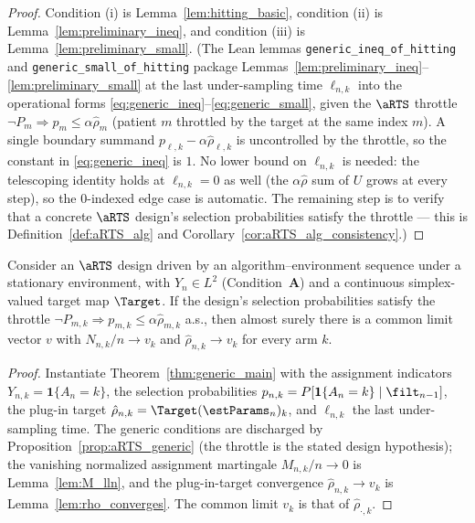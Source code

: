 \begin{proof}
Condition (i) is Lemma~\ref{lem:hitting_basic}, condition (ii) is
Lemma~\ref{lem:preliminary_ineq}, and condition (iii) is
Lemma~\ref{lem:preliminary_small}. (The Lean lemmas
\texttt{generic\_ineq\_of\_hitting} and \texttt{generic\_small\_of\_hitting} package
Lemmas~\ref{lem:preliminary_ineq}--\ref{lem:preliminary_small} at the last under-sampling time
$\ell_{n,k}$ into the operational forms \eqref{eq:generic_ineq}--\eqref{eq:generic_small},
given the $\aRTS$ throttle $\neg P_m \Rightarrow p_{m}\le\alpha\hat\rho_m$ (patient $m$ throttled
by the target at the same index $m$). A single boundary summand $p_{\ell,k}-\alpha\hat\rho_{\ell,k}$
is uncontrolled by the throttle, so the constant in \eqref{eq:generic_ineq} is $1$. No lower bound
on $\ell_{n,k}$ is needed: the telescoping identity holds at $\ell_{n,k}=0$ as well (the
$\alpha\hat\rho$ sum of $U$ grows at every step), so the $0$-indexed edge case is automatic. The
remaining step is to verify that a concrete $\aRTS$ design's selection probabilities satisfy the
throttle — this is Definition~\ref{def:aRTS_alg} and Corollary~\ref{cor:aRTS_alg_consistency}.)
\end{proof}

\begin{corollary}
\label{cor:aRTS_consistency}
Consider an $\aRTS$ design driven by an algorithm–environment sequence under a stationary
environment, with $Y_n\in L^2$ (Condition~\textbf{A}) and a continuous simplex-valued target map
$\Target$. If the design's selection probabilities satisfy the throttle
$\neg P_{m,k}\Rightarrow p_{m,k}\le\alpha\hat\rho_{m,k}$ a.s., then almost surely there is a common
limit vector $v$ with $N_{n,k}/n\to v_k$ and $\hat\rho_{n,k}\to v_k$ for every arm $k$.
\end{corollary}

\begin{proof}
Instantiate Theorem~\ref{thm:generic_main} with the assignment indicators
$Y_{n,k}=\mathbf 1\{A_n=k\}$, the selection probabilities
$p_{n,k}=P[\mathbf 1\{A_n=k\}\mid\filt_{n-1}]$, the plug-in target
$\hat\rho_{n,k}=\Target(\estParams_n)_k$, and $\ell_{n,k}$ the last under-sampling time. The generic
conditions are discharged by Proposition~\ref{prop:aRTS_generic} (the throttle is the stated design
hypothesis); the vanishing normalized assignment martingale $M_{n,k}/n\to0$ is
Lemma~\ref{lem:M_lln}, and the plug-in-target convergence $\hat\rho_{n,k}\to v_k$ is
Lemma~\ref{lem:rho_converges}. The common limit $v_k$ is that of $\hat\rho_{\cdot,k}$.
\end{proof}

